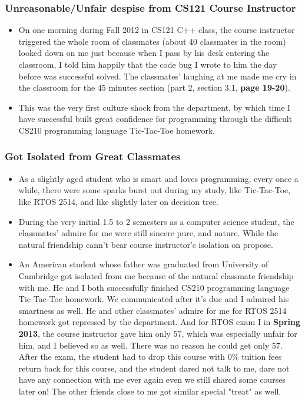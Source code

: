 \documentclass[9pt,b5paper]{article}
\begin{document}
\subsubsection{Unreasonable/Unfair despise from CS121 Course Instructor}
\label{sec-12-3-1}
\begin{itemize}
\item On one morning during Fall 2012 in CS121 C++ class, the course instructor triggered the whole room of classmates (about 40 classmates in the room) looked down on me just because when I pass by his desk entering the classroom, I told him happily that the code bug I wrote to him the day before was successful solved. The classmates' laughing at me made me cry in the classroom for the 45 minutes section (part 2, section 3.1, \textbf{page 19-20}).
\item This was the very first culture shock from the department, by which time I have successful built great confidence for programming through the difficult CS210 programming language Tic-Tac-Toe homework.
\end{itemize}
\subsubsection{Got Isolated from Great Classmates}
\label{sec-12-3-2}
\begin{itemize}
\item As a slightly aged student who is smart and loves programming, every once a while, there were some sparks burst out during my study, like Tic-Tac-Toe, like RTOS 2514, and like slightly later on decision tree.
\item During the very initial 1.5 to 2 semesters as a computer science student, the classmates' admire for me were still sincere pure, and nature. While the natural friendship cann't bear course instructor's isolation on propose.
\item An American student whose father was graduated from University of Cambridge got isolated from me because of the natural classmate friendship with me. He and I both successfully finished CS210 programming language Tic-Tac-Toe homework. We communicated after it's due and I admired his smartness as well. He and other classmates' admire for me for RTOS 2514 homework got repressed by the department. And for RTOS exam I in \textbf{Spring 2013}, the course instructor gave him only 57, which was especially unfair for him, and I believed so as well. There was no reason he could get only 57. After the exam, the student had to drop this course with 0\% tuition fees return back for this course, and the student dared not talk to me, dare not have any connection with me ever again even we still shared some courses later on! The other friends close to me got similar special "treat" as well.
\end{itemize}
\end{document}
